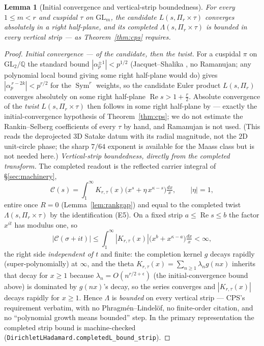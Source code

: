 \documentclass[11pt]{article}
\newtheorem{lemma}[theorem]{Lemma}
\theoremstyle{definition}
\renewcommand{\Re}{\operatorname{Re}}
\newcommand{\Sym}{\operatorname{Sym}}
\begin{document}
\begin{lemma}[Initial convergence and vertical-strip boundedness]\label{lem:bounded}
For every $1\le m<r$ and cuspidal $\tau$ on $\mathrm{GL}_m$, the candidate $L(s,\Pi_r\times\tau)$ converges
absolutely in a right half-plane, and its completed $\Lambda(s,\Pi_r\times\tau)$ is bounded in every vertical
strip --- as Theorem~\ref{thm:cps} requires.
\end{lemma}

\begin{proof}
\emph{Initial convergence --- of the candidate, then the twist.} For a cuspidal $\pi$ on
$\mathrm{GL}_2/\mathbb Q$ the standard bound $|\alpha_p^{\pm1}|<p^{1/2}$ (Jacquet--Shalika \cite{JS}, no
Ramanujan; any polynomial local bound giving some right half-plane would do) gives $|\alpha_p^{\,r-2k}|<p^{r/2}$
for the $\Sym^r$ weights, so the candidate Euler product
$L(s,\Pi_r)$ converges absolutely on some right half-plane $\Re s>1+\tfrac r2$. Absolute convergence of the
\emph{twist} $L(s,\Pi_r\times\tau)$ then follows in some right half-plane by \cite[Lemma~2.2]{CPS} --- exactly
the initial-convergence hypothesis of Theorem~\ref{thm:cps}; we do not estimate the Rankin--Selberg
coefficients of every $\tau$ by hand, and Ramanujan is not used. (This reads the deprojected $3$D Satake datum
with its radial magnitude, not the $2$D unit-circle phase; the sharp $7/64$ exponent \cite{KimSarnak} is
available for the Maass class but is not needed here.)
\emph{Vertical-strip boundedness, directly from the completed transform.} The completed readout is the
reflected carrier integral of \S\ref{sec:machinery},
\[
  \mathcal C(s)=\int_1^\infty K_{r,\tau}(x)\bigl(x^{s}+\eta\,x^{\kappa-s}\bigr)\tfrac{dx}{x},\qquad|\eta|=1,
\]
entire once $R=0$ (Lemma~\ref{lem:rankgap}) and equal to the completed twist $\Lambda(s,\Pi_r\times\tau)$ by
the identification \textup{(E5)}. On a fixed strip $a\le\Re s\le b$ the factor $x^{it}$ has modulus one, so
\[
  |\mathcal C(\sigma+it)|\le\int_1^\infty|K_{r,\tau}(x)|\bigl(x^{b}+x^{\kappa-a}\bigr)\tfrac{dx}{x}<\infty,
\]
the right side \emph{independent of $t$} and finite: the completion kernel $g$ decays rapidly (super-polynomially)
at $\infty$, and the theta $K_{r,\tau}(x)=\sum_{n\ge1}\lambda_n g(nx)$ inherits that decay for $x\ge1$ because
$\lambda_n=O(n^{r/2+\epsilon})$ (the initial-convergence bound above) is dominated by $g(nx)$'s decay, so the
series converges and $|K_{r,\tau}(x)|$ decays rapidly for $x\ge1$. Hence $\Lambda$ is \emph{bounded} on every
vertical strip --- CPS's requirement verbatim,
with no Phragm\'en--Lindel\"of, no finite-order citation, and no ``polynomial growth means bounded'' step. In
the primary representation the completed strip bound is machine-checked
(\texttt{DirichletLHadamard.completedL\_bound\_strip}).
\end{proof}
\end{document}
